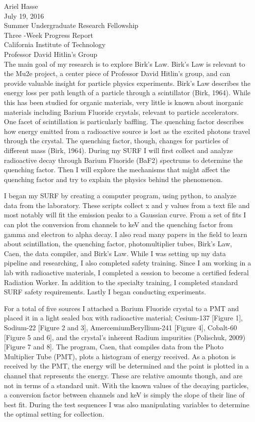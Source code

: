 \documentclass{article}
\begin{document}
\noindent 
Ariel Hasse\\
July 19, 2016\\
Summer Undergraduate Research Fellowship\\
Three -Week Progress Report\\
California Institute of Technology\\
Professor David Hitlin’s Group\\


The main goal of my research is to explore Birk's Law. Birk’s Law is relevant to the Mu2e project, a center piece of Professor David Hitlin’s group, and can provide valuable insight for particle physics experiments. Birk’s Law describes the energy loss per path length of a particle through a scintillator (Birk, 1964).  While this has been studied for organic materials, very little is known about inorganic materials including Barium Fluoride crystals, relevant to particle accelerators.  One facet of scintillation is particularly baffling. The quenching factor describes how energy emitted from a radioactive source is lost as the excited photons travel through the crystal. The quenching factor, though, changes for particles of different mass (Birk, 1964). During my SURF I will first collect and analyze radioactive decay through Barium Fluoride (BaF2) spectrums to determine the quenching factor. Then I will explore the mechanisms that might affect the quenching factor and try to explain the physics behind the phenomenon.

I began my SURF by creating a computer program, using python, to analyze data from the laboratory. These scripts collect x and y values from a text file and most notably will fit the emission peaks to a Gaussian curve. From a set of fits I can plot the conversion from channels to keV and the quenching factor from gamma and electron to alpha decay. I also read many papers in the field to learn about scintillation, the quenching factor, photomultiplier tubes, Birk’s Law, Caen, the data compiler, and Birk’s Law. While I was setting up my data pipeline and researching, I also completed safety training. Since I am working in a lab with radioactive materials, I completed a session to become a certified federal Radiation Worker. In addition to the specialty training, I completed standard SURF safety requirements. Lastly I began conducting experiments.

For a total of five sources I attached a Barium Fluoride crystal to a PMT and placed it in a light sealed box with radioactive material; Cesium-137 [Figure 1], Sodium-22 [Figure 2 and 3], AmercemiumBeryllium-241 [Figure 4], Cobalt-60 [Figure 5 and 6], and the crystal’s inherent Radium impurities (Polischuk, 2009)  [Figure 7 and 8]. The program, Caen, that compiles data from the Photo Multiplier Tube (PMT), plots a histogram of energy received. As a photon is received by the PMT, the energy will be determined and the point is plotted in a channel that represents the energy. These are relative amounts though, and are not in terms of a standard unit. With the known values of the decaying particles, a conversion factor between channels and keV is simply the slope of their line of best fit. During the test sequences I was also manipulating variables to determine the optimal setting for collection. 
\end{document}
